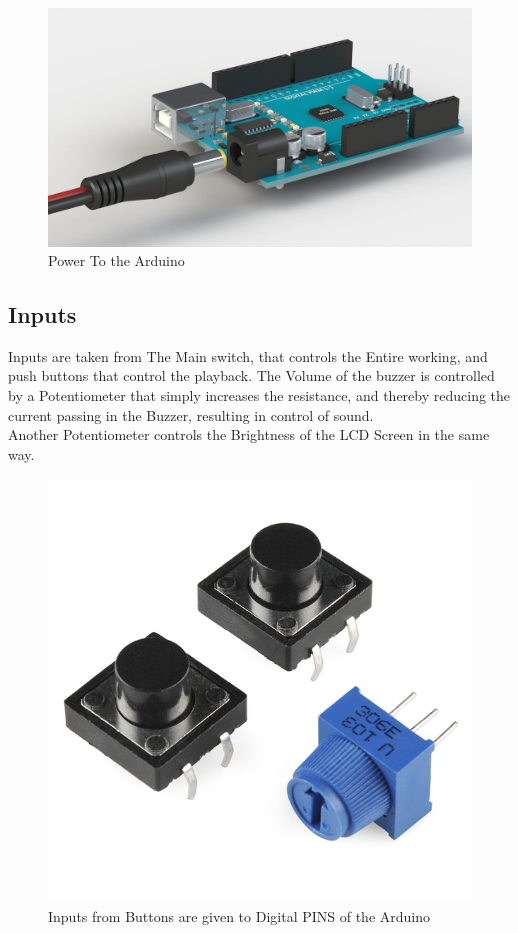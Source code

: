 \documentclass[11pt]{article}
\begin{document}
\begin{figure}[H]
	\centering
	\includegraphics[scale=.25]{arduino.jpg}
	\caption{Power To the Arduino}
	\label{fig:Arduion pic}
\end{figure}

\subsection{Inputs}
Inputs are taken from The Main switch, that controls the Entire working, and push buttons that control the playback. The Volume of the buzzer is controlled by a Potentiometer that simply increases the resistance, and thereby reducing the current passing in the Buzzer, resulting in control of sound. \\

Another Potentiometer controls the Brightness of the LCD Screen in the same way.

\begin{figure}[H]
	\centering
	\includegraphics[scale=.8]{push_buttons.jpg}
	\caption{Inputs from Buttons are given to Digital PINS of the Arduino}
	\label{fig:button pic}
\end{figure}
\end{document}
